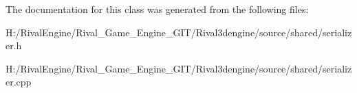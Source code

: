 The documentation for this class was generated from the following files\+:\begin{DoxyCompactItemize}
\item 
H\+:/\+Rival\+Engine/\+Rival\+\_\+\+Game\+\_\+\+Engine\+\_\+\+G\+I\+T/\+Rival3dengine/source/shared/serializer.\+h\item 
H\+:/\+Rival\+Engine/\+Rival\+\_\+\+Game\+\_\+\+Engine\+\_\+\+G\+I\+T/\+Rival3dengine/source/shared/serializer.\+cpp\end{DoxyCompactItemize}
